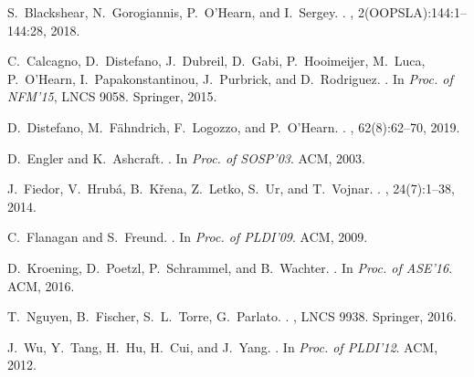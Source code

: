 \documentclass[runningheads]{llncs}
\begin{document}
\begin{thebibliography}{1}
\vspace*{-2.5mm}

S.~Blackshear, N.~Gorogiannis, P.~O'Hearn, and I.~Sergey.
.
,
  2(OOPSLA):144:1--144:28, 2018.

C.~Calcagno, D.~Distefano, J.~Dubreil, D.~Gabi, P.~Hooimeijer, M.~Luca,
P.~O'Hearn, I.~Papakonstantinou, J.~Purbrick, and D.~Rodriguez.
.
\newblock In {\em Proc. of NFM'15}, LNCS 9058. Springer, 2015.

D.~Distefano, M.~F\"{a}hndrich, F.~Logozzo, and P.~O'Hearn.
.
, 62(8):62--70, 2019.

D.~Engler and K.~Ashcraft.
.
\newblock In {\em Proc. of SOSP'03}. ACM, 2003.

J.~Fiedor, V.~Hrub\'{a}, B.~K\v{r}ena, Z.~Letko, S.~Ur, and T.~Vojnar.
.
, 24(7):1--38,
  2014.

C.~Flanagan and S.~Freund.
.
\newblock In {\em Proc. of PLDI'09}. ACM, 2009.

D.~Kroening, D.~Poetzl, P.~Schrammel, and B.~Wachter.
.
\newblock In {\em Proc. of ASE'16}. ACM, 2016.

T.~Nguyen, B.~Fischer, S.~L.~Torre, G.~Parlato.
.
, LNCS 9938. Springer, 2016.

J.~Wu, Y.~Tang, H.~Hu, H.~Cui, and J.~Yang.
.
\newblock In {\em Proc. of PLDI'12}. ACM, 2012.

\end{thebibliography}


\end{document}
